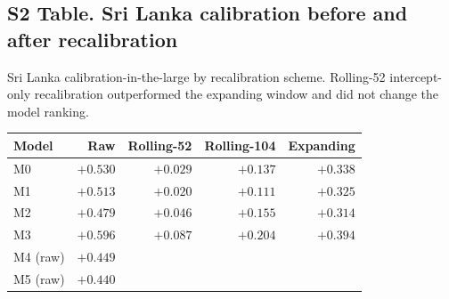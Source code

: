 \documentclass[11pt,a4paper]{article}
\begin{document}
\subsection*{S2 Table. Sri Lanka calibration before and after recalibration}
\noindent Sri Lanka calibration-in-the-large by recalibration scheme. Rolling-52 intercept-only recalibration outperformed the expanding window and did not change the model ranking.\\[0.3em]
{\footnotesize\begin{tabular}{@{}lrrrr@{}}
\toprule
Model & Raw & Rolling-52 & Rolling-104 & Expanding \\
\midrule
M0 & $+0.530$ & $+0.029$ & $+0.137$ & $+0.338$ \\
M1 & $+0.513$ & $+0.020$ & $+0.111$ & $+0.325$ \\
M2 & $+0.479$ & $+0.046$ & $+0.155$ & $+0.314$ \\
M3 & $+0.596$ & $+0.087$ & $+0.204$ & $+0.394$ \\
M4 (raw) & $+0.449$ & & & \\
M5 (raw) & $+0.440$ & & & \\
\bottomrule
\end{tabular}}
\end{document}
